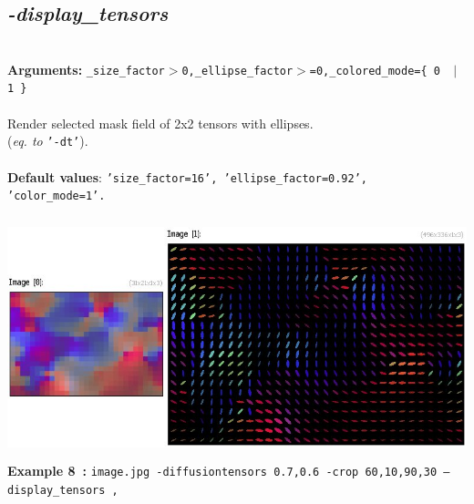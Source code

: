 \documentclass[a4paper,11pt,twoside]{book}
\begin{document}
\subsection{\emph{-display\_tensors} }\vspace*{-0.5em}
~\\\textbf{Arguments: } 
{\small \texttt{\_size\_factor$>$0,\_ellipse\_factor$>$=0,\_colored\_mode=\{ 0 ~$|$~ 1 \}}}\\~\\
Render selected mask field of 2x2 tensors with ellipses.
~\\(\emph{eq. to} {\small \texttt{'-dt'}}).
~\\~\\\textbf{Default values}: {\small \texttt{'size\_factor=16', 'ellipse\_factor=0.92', 'color\_mode=1'.}}
\begin{center}\includegraphics[keepaspectratio=true,height=7cm,width=\textwidth]{img/gmic_def8.jpg}\\
{\footnotesize \textbf{Example 8~:} \texttt{image.jpg -diffusiontensors 0.7,0.6 -crop 60,10,90,30 --display\_tensors ,}}
\end{center}
\end{document}

